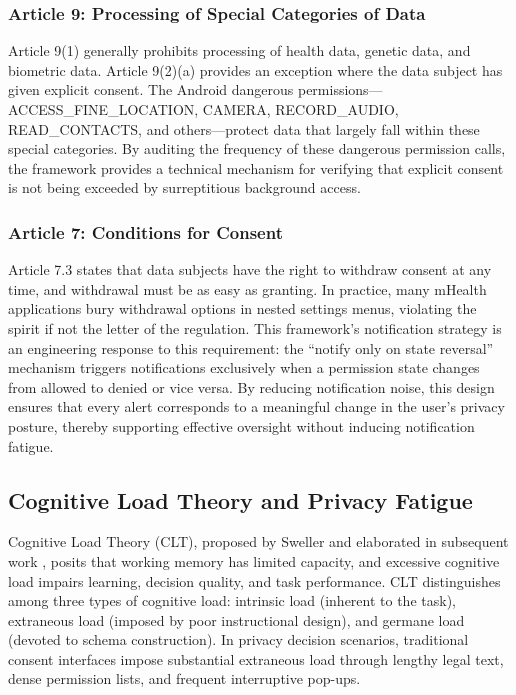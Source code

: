 \subsubsection{Article 9: Processing of Special Categories of Data}
Article 9(1) generally prohibits processing of health data, genetic data, and biometric data. Article 9(2)(a) provides an exception where the data subject has given explicit consent. The Android dangerous permissions—ACCESS\_FINE\_LOCATION, CAMERA, RECORD\_AUDIO, READ\_CONTACTS, and others—protect data that largely fall within these special categories. By auditing the frequency of these dangerous permission calls, the framework provides a technical mechanism for verifying that explicit consent is not being exceeded by surreptitious background access.

\subsubsection{Article 7: Conditions for Consent}
Article 7.3 states that data subjects have the right to withdraw consent at any time, and withdrawal must be as easy as granting. In practice, many mHealth applications bury withdrawal options in nested settings menus, violating the spirit if not the letter of the regulation. This framework's notification strategy is an engineering response to this requirement: the ``notify only on state reversal'' mechanism triggers notifications exclusively when a permission state changes from allowed to denied or vice versa. By reducing notification noise, this design ensures that every alert corresponds to a meaningful change in the user's privacy posture, thereby supporting effective oversight without inducing notification fatigue.

\subsection{Cognitive Load Theory and Privacy Fatigue}
Cognitive Load Theory (CLT), proposed by Sweller and elaborated in subsequent work \cite{27}, posits that working memory has limited capacity, and excessive cognitive load impairs learning, decision quality, and task performance. CLT distinguishes among three types of cognitive load: intrinsic load (inherent to the task), extraneous load (imposed by poor instructional design), and germane load (devoted to schema construction). In privacy decision scenarios, traditional consent interfaces impose substantial extraneous load through lengthy legal text, dense permission lists, and frequent interruptive pop-ups.

